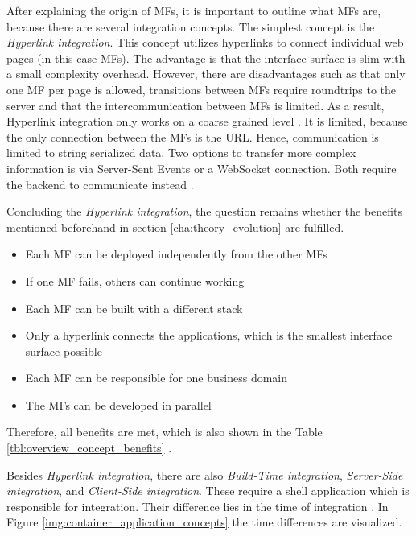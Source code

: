 After explaining the origin of \acp{MF}, it is important to outline what \acp{MF} are, because there are several integration concepts.
The simplest concept is the \textit{Hyperlink integration}.
This concept utilizes hyperlinks to connect individual web pages (in this case \acp{MF}).
The advantage is that the interface surface is slim with a small complexity overhead.
However, there are disadvantages such as that only one \ac{MF} per page is allowed, transitions between \acp{MF} require roundtrips to the server and that the intercommunication between \acp{MF} is limited.
As a result, Hyperlink integration only works on a coarse grained level \cite{Leitner.2020}.
It is limited, because the only connection between the \acp{MF} is the \ac{URL}.
Hence, communication is limited to string serialized data.
Two options to transfer more complex information is via Server-Sent Events or a WebSocket connection.
Both require the backend to communicate instead \cite{Vogel.2020.Steyer}.

Concluding the \textit{Hyperlink integration}, the question remains whether the benefits mentioned beforehand in section \ref{cha:theory_evolution} are fulfilled.

\begin{itemize}
    \item Each \ac{MF} can be deployed independently from the other \acp{MF}
    \item If one \ac{MF} fails, others can continue working
    \item Each \ac{MF} can be built with a different stack
    \item Only a hyperlink connects the applications, which is the smallest interface surface possible
    \item Each \ac{MF} can be responsible for one business domain
    \item The \acp{MF} can be developed in parallel
\end{itemize}

Therefore, all benefits are met, which is also shown in the Table \ref{tbl:overview_concept_benefits} \cite{Leitner.2020}.

Besides \textit{Hyperlink integration}, there are also \textit{Build-Time integration}, \textit{Server-Side integration}, and \textit{Client-Side integration}.
These require a shell application which is responsible for integration.
Their difference lies in the time of integration \cite{Leitner.2020}.
In Figure \ref{img:container_application_concepts} the time differences are visualized.

